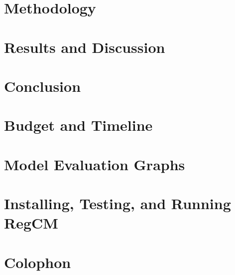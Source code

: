 \chapter{Methodology}
\Mprintcontents
	\label{ch:method}
	
	\stopcontents[chapters]
	\clearpage

%	

\chapter{Results and Discussion}
	\Mprintcontents
	\label{ch:results}
	
	\stopcontents[chapters]
	\clearpage
	
\chapter{Conclusion}
	\Mprintcontents
	\label{ch:conclusion}
	
	\stopcontents[chapters]
	\clearpage


\printbibliography

\clearpage

\appendix
\chapter{Budget and Timeline}
	\label{app:budget-timeline}
	
	
\chapter{Model Evaluation Graphs}
	\label{app:model-evaluation-graphs}
	
	
\chapter{Installing, Testing, and Running RegCM}
	\label{app:regcm-install-run}
	

\backmatter
\chapter{Colophon}
	



